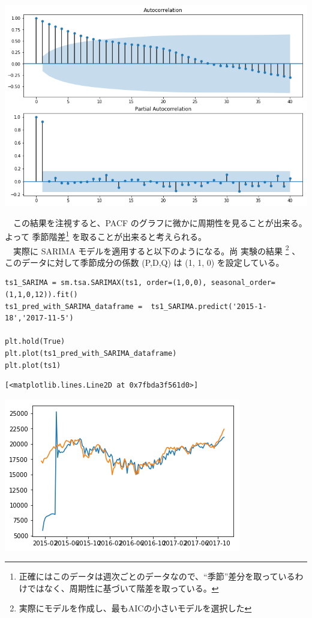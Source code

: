 \documentclass{scrartcl}
\begin{document}
\begin{center}
\includegraphics[width=.9\linewidth]{./obipy-resources/xBGhjB.png}
\end{center}

　この結果を注視すると、PACF のグラフに微かに周期性を見ることが出来る。よって 季節階差\footnote{正確にはこのデータは週次ごとのデータなので、``季節''差分を取っているわけではなく、周期性に基づいて階差を取っている。} を取ることが出来ると考えられる。\\
　実際に SARIMA モデルを適用すると以下のようになる。尚 実験の結果 \footnote{実際にモデルを作成し、最もAICの小さいモデルを選択した} 、このデータに対して季節成分の係数 (P,D,Q) は (1, 1, 0) を設定している。\\
\begin{verbatim}
ts1_SARIMA = sm.tsa.SARIMAX(ts1, order=(1,0,0), seasonal_order=(1,1,0,12)).fit()
ts1_pred_with_SARIMA_dataframe =  ts1_SARIMA.predict('2015-1-18','2017-11-5')

plt.hold(True)
plt.plot(ts1_pred_with_SARIMA_dataframe)
plt.plot(ts1)
\end{verbatim}

\begin{verbatim}
[<matplotlib.lines.Line2D at 0x7fbda3f561d0>]
\end{verbatim}
\begin{center}
\includegraphics[width=.9\linewidth]{./obipy-resources/FRNY3r.png}
\end{center}
\end{document}
